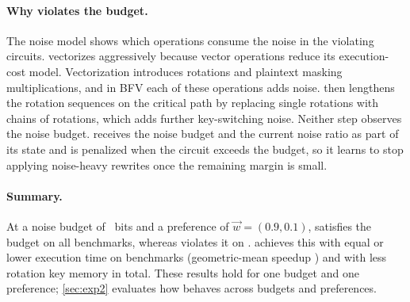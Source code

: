 \paragraph{Why \baseline{} violates the budget.}
The noise model shows which operations consume the noise in the violating
circuits. 
\chehabrl{} vectorizes aggressively because vector operations reduce its
execution-cost model. Vectorization introduces rotations and plaintext
masking multiplications, and in BFV each of these operations adds noise.
\rks{} then lengthens the rotation sequences on the critical path by
replacing single rotations with chains of rotations, which adds further
key-switching noise. Neither step observes the noise budget. \cmorl{}
receives the noise budget and the current noise ratio as part of its state
and is penalized when the circuit exceeds the budget, so it learns to stop
applying noise-heavy rewrites once the remaining margin is small.

\paragraph{Summary.}
At a noise budget of ~bits and a preference of $\vec{w}=(0.9,0.1)$,
\cmorl{} satisfies the budget on all  benchmarks, whereas \baseline{}
violates it on . \cmorl{} achieves this with equal or lower execution
time on  benchmarks (geometric-mean speedup \ex{$1.02\times$}) and
with  less rotation key memory in total. These results hold for one
budget and one preference; \cref{sec:exp2}  evaluates
how \cmorl{} behaves across budgets and preferences.

